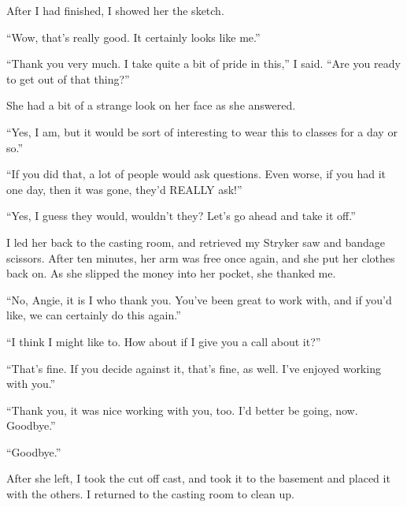 After I had finished, I showed her the sketch.

``Wow, that's really good. It certainly looks like me.''

``Thank you very much. I take quite a bit of pride in this,'' I said. ``Are you ready to get out
of that thing?''

She had a bit of a strange look on her face as she answered.

``Yes, I am, but it would be sort of interesting to wear this to classes for a day or so.''

``If you did that, a lot of people would ask questions. Even worse, if you had it one day, then
it was gone, they'd REALLY ask!''

``Yes, I guess they would, wouldn't they? Let's go ahead and take it off.''

I led her back to the casting room, and retrieved my Stryker saw and bandage scissors. After ten
minutes, her arm was free once again, and she put her clothes back on. As she slipped the money
into her pocket, she thanked me.

``No, Angie, it is I who thank you. You've been great to work with, and if you'd like, we can
certainly do this again.''

``I think I might like to. How about if I give you a call about it?''

``That's fine. If you decide against it, that's fine, as well. I've enjoyed working with you.''

``Thank you, it was nice working with you, too. I'd better be going, now. Goodbye.''

``Goodbye.''

After she left, I took the cut off cast, and took it to the basement and placed it with the
others. I returned to the casting room to clean up.

